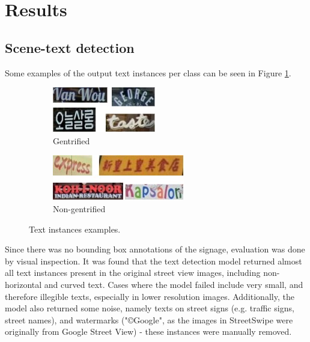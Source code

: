 \section{Results}
\label{sec:results}

\subsection{Scene-text detection}
Some examples of the output text instances per class can be seen in Figure \ref{fig:instance_ex}.

{
\setlength\intextsep{7pt}
\begin{figure}[H]
\centering
\begin{subfigure}[b]{0.22\textwidth}
    \includegraphics[width=\textwidth]{media/results/instances/instance_gen.jpg}
    \caption{Gentrified}
\end{subfigure}
\quad
\begin{subfigure}[b]{0.22\textwidth}
    \includegraphics[width=\textwidth]{media/results/instances/instance_non.jpg}
    \caption{Non-gentrified}
\end{subfigure}
\caption{Text instances examples.}
\label{fig:instance_ex}
\end{figure}
}

Since there was no bounding box annotations of the signage, evaluation was done by visual inspection. It was found that the text detection model returned almost all text instances present in the original street view images, including non-horizontal and curved text. Cases where the model failed include very small, and therefore illegible texts, especially in lower resolution images. Additionally, the model also returned some noise, namely texts on street signs (e.g. traffic signs, street names), and watermarks ("©Google", as the images in StreetSwipe were originally from Google Street View) - these instances were manually removed.

